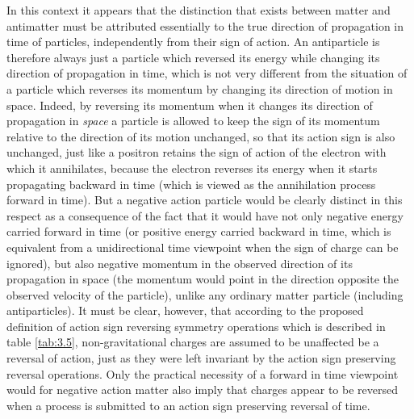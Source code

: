 \documentclass[notitlepage,12pt]{report}
\begin{document}
In this context it appears that the distinction that exists between matter and antimatter must be attributed essentially to the true direction of propagation in time of particles, independently from their sign of action. An antiparticle is therefore always just a particle which reversed its energy while changing its direction of propagation in time, which is not very different from the situation of a particle which reverses its momentum by changing its direction of motion in space. Indeed, by reversing its momentum when it changes its direction of propagation in \textit{space} a particle is allowed to keep the sign of its momentum relative to the direction of its motion unchanged, so that its action sign is also unchanged, just like a positron retains the sign of action of the electron with which it annihilates, because the electron reverses its energy when it starts propagating backward in time (which is viewed as the annihilation process forward in time). But a negative action particle would be clearly distinct in this respect as a consequence of the fact that it would have not only negative energy carried forward in time (or positive energy carried backward in time, which is equivalent from a unidirectional time viewpoint when the sign of charge can be ignored), but also negative momentum in the observed direction of its propagation in space (the momentum would point in the direction opposite the observed velocity of the particle), unlike any ordinary matter particle (including antiparticles). It must be clear, however, that according to the proposed definition of action sign reversing symmetry operations which is described in table \ref{tab:3.5}, non-gravitational charges are assumed to be unaffected be a reversal of action, just as they were left invariant by the action sign preserving reversal operations. Only the practical necessity of a forward in time viewpoint would for negative action matter also imply that charges appear to be reversed when a process is submitted to an action sign preserving reversal of time.
\end{document}
